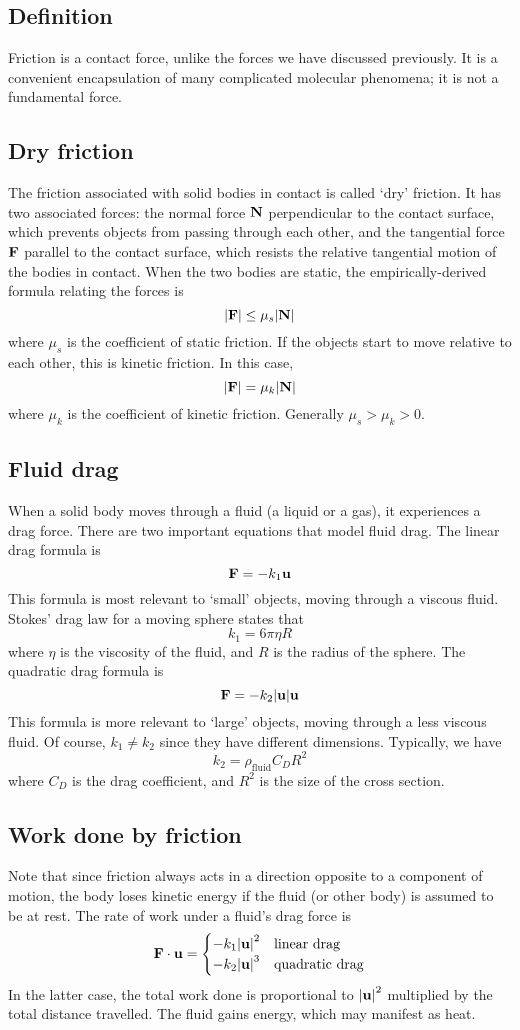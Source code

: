 \subsection{Definition}
Friction is a contact force, unlike the forces we have discussed previously.
It is a convenient encapsulation of many complicated molecular phenomena; it is not a fundamental force.

\subsection{Dry friction}
The friction associated with solid bodies in contact is called `dry' friction.
It has two associated forces: the normal force \(\vb N\) perpendicular to the contact surface, which prevents objects from passing through each other, and the tangential force \(\vb F\) parallel to the contact surface, which resists the relative tangential motion of the bodies in contact.
When the two bodies are static, the empirically-derived formula relating the forces is
\[
	\abs{\vb F} \leq \mu_s \abs{\vb N}
\]
where \(\mu_s\) is the coefficient of static friction.
If the objects start to move relative to each other, this is kinetic friction.
In this case,
\[
	\abs{\vb F} = \mu_k \abs{\vb N}
\]
where \(\mu_k\) is the coefficient of kinetic friction.
Generally \(\mu_s > \mu_k > 0\).

\subsection{Fluid drag}
When a solid body moves through a fluid (a liquid or a gas), it experiences a drag force.
There are two important equations that model fluid drag.
The linear drag formula is
\[
	\vb F = -k_1 \vb u
\]
This formula is most relevant to `small' objects, moving through a viscous fluid.
Stokes' drag law for a moving sphere states that
\[
	k_1 = 6 \pi \eta R
\]
where \(\eta\) is the viscosity of the fluid, and \(R\) is the radius of the sphere.
The quadratic drag formula is
\[
	\vb F = -k_2 \abs{\vb u} \vb u
\]
This formula is more relevant to `large' objects, moving through a less viscous fluid.
Of course, \(k_1 \neq k_2\) since they have different dimensions.
Typically, we have
\[
	k_2 = \rho_{\text{fluid}} C_D R^2
\]
where \(C_D\) is the drag coefficient, and \(R^2\) is the size of the cross section.

\subsection{Work done by friction}
Note that since friction always acts in a direction opposite to a component of motion, the body loses kinetic energy if the fluid (or other body) is assumed to be at rest.
The rate of work under a fluid's drag force is
\[
	\vb F \cdot \vb u = \begin{cases}
		-k_1 \abs{\vb u}^2 & \text{linear drag}    \\
		-k_2 \abs{\vb u}^3 & \text{quadratic drag}
	\end{cases}
\]
In the latter case, the total work done is proportional to \(\abs{\vb u}^2\) multiplied by the total distance travelled.
The fluid gains energy, which may manifest as heat.

